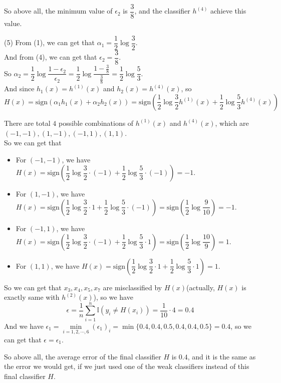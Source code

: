 So above all, the minimum value of $\epsilon_2$ is $\dfrac{3}{8}$, and the classifier $h^{(4)}$ achieve this value.

(5) From (1), we can get that $\alpha_1=\dfrac{1}{2}\log\dfrac{3}{2}$. \\
And from (4), we can get that $\epsilon_2=\dfrac{3}{8}$. \\
So $\alpha_2=\dfrac{1}{2}\log\dfrac{1-\epsilon_2}{\epsilon_2}=\dfrac{1}{2}\log\dfrac{1-\frac{3}{8}}{\frac{3}{8}}=\dfrac{1}{2}\log\dfrac{5}{3}$. \\
And since $h_1(x)=h^{(1)}(x)$ and $h_2(x)=h^{(4)}(x)$, so
$$H(x)=\text{sign}(\alpha_1h_1(x)+\alpha_2h_2(x))=\text{sign}\left(\dfrac{1}{2}\log\dfrac{3}{2}h^{(1)}(x)+\dfrac{1}{2}\log\dfrac{5}{3}h^{(4)}(x)\right)$$

There are total $4$ possible combinations of $h^{(1)}(x)$ and $h^{(4)}(x)$, which are $(-1,-1), (1,-1), (-1,1), (1,1)$. \\
So we can get that
\begin{itemize}
    \item For $(-1,-1)$, we have $H(x)=\text{sign}\left(\dfrac{1}{2}\log\dfrac{3}{2}\cdot (-1)+\dfrac{1}{2}\log\dfrac{5}{3}\cdot (-1)\right)=-1$.
    \item For $(1,-1)$, we have $H(x)=\text{sign}\left(\dfrac{1}{2}\log\dfrac{3}{2}\cdot 1+\dfrac{1}{2}\log\dfrac{5}{3}\cdot (-1)\right)=\text{sign}(\dfrac{1}{2}\log\dfrac{9}{10})=-1$.
    \item For $(-1,1)$, we have $H(x)=\text{sign}\left(\dfrac{1}{2}\log\dfrac{3}{2}\cdot (-1)+\dfrac{1}{2}\log\dfrac{5}{3}\cdot 1\right)=\text{sign}(\dfrac{1}{2}\log\dfrac{10}{9})=1$.
    \item For $(1,1)$, we have $H(x)=\text{sign}\left(\dfrac{1}{2}\log\dfrac{3}{2}\cdot 1+\dfrac{1}{2}\log\dfrac{5}{3}\cdot 1\right)=1$.
\end{itemize}

So we can get that $x_3, x_4, x_5, x_7$ are misclassified by $H(x)$(actually, $H(x)$ is exactly same with $h^{(2)}(x)$), so we have
$$\epsilon=\dfrac{1}{n}\sum_{i=1}^n\mathbb{I}(y_i\neq H(x_i))=\dfrac{1}{10}\cdot 4=0.4$$
And we have $\epsilon_1=\min\limits_{i=1,2,\cdots,6}(\epsilon_1)_i=\min\{0.4, 0.4, 0.5, 0.4, 0.4, 0.5\}=0.4$,
so we can get that $\epsilon=\epsilon_1$.

So above all, the average error of the final classifier $H$ is $0.4$, and it is the same as the error we would get, if we just used one of the weak classifiers instead of this final classifier $H$.

\newpage